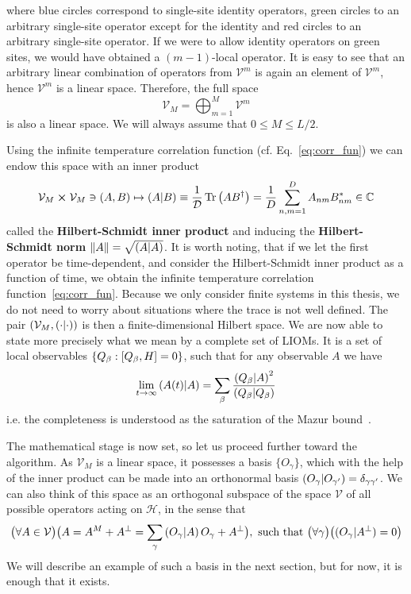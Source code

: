 where blue circles correspond to single-site identity operators, green circles to an arbitrary
single-site operator except for the identity and red circles to an arbitrary single-site operator.
If we were to allow identity operators on green sites, we would have obtained a \((m-1)\)-local operator.
It is easy to see that an arbitrary linear combination of operators from \(\mathcal{V}^m\) is again
an element of \(\mathcal{V}^m\), hence \(\mathcal{V}^m\) is a linear space. Therefore,
the full space
\begin{equation}
    \mathcal{V}_{M} = \bigoplus_{m=1}^{M} \mathcal{V}^m
\end{equation}
is also a linear space. We will always assume that \(0\leq M \leq L/2\).

Using the infinite temperature correlation function (cf. Eq.~\eqref{eq:corr_fun}) we can endow this space with an inner product
\begin{equation}
    \mathcal{V}_M \cross \mathcal{V}_M \ni (A, B) \mapsto \left(A \middle| B\right)
    \equiv \frac{1}{\mathcal{D}}\Tr\left(AB^{\dagger}\right) = \frac{1}{D}\sum_{n,m = 1}^{D} A_{nm} B_{nm}^{\ast} \in \mathbb{C}
    \label{eq:hs_prod}
\end{equation}
called the \textbf{Hilbert-Schmidt inner product} and
inducing the \textbf{Hilbert-Schmidt norm} \(\norm{A} = \sqrt{\left(A \middle| A\right)}\). It is worth noting, that
if we let the first operator be time-dependent, and consider the Hilbert-Schmidt inner product
as a function of time, we obtain the infinite temperature correlation function~\eqref{eq:corr_fun}.
Because we only consider finite systems in this thesis, we do not need to worry about
situations where the trace is not well defined. The pair \( (\mathcal{V}_M, \left(\cdot \middle| \cdot\right)) \)
is then a finite-dimensional Hilbert space.
We are now able to state more precisely what we mean by a complete set of LIOMs.
It is a set of local observables \(\{Q_{\beta} : \comm{Q_{\beta}}{H} = 0\}\), such that
for any observable \(A\) we have
\begin{equation}
    \lim_{t\to\infty} \left(A(t) \middle| A\right) = \sum_{\beta} \frac{\left(Q_{\beta} \middle| A\right)^2}{\left(Q_{\beta} \middle| Q_{\beta}\right)}
\end{equation}
i.e. the completeness is understood as the saturation of the Mazur bound~\autocite{Mazur1969}.

The mathematical stage is now set, so let us proceed further toward the algorithm. 
As \(\mathcal{V}_M\) is a linear space, it possesses a basis \(\{O_{\gamma}\}\),
which with the help of the inner product can be made into an orthonormal basis \(\left(O_{\gamma} \middle| O_{\gamma^{\prime}}\right) = \delta_{\gamma\gamma^{\prime}}\).
We can also think of this space as an orthogonal subspace of the space \(\mathcal{V}\) of all possible operators
acting on \(\mathcal{H}\), in the sense that
\begin{equation}
    \big(\forall A \in \mathcal{V} \big) \big( A = A^M + A^{\perp} = \sum_{\gamma} \left(O_{\gamma} \middle| A\right) O_{\gamma} + A^{\perp}\big) ,
    \text{ such that } \big(\forall \gamma\big) \big( ({O_{\gamma}}|{A^{\perp}}) = 0\big)
    \label{eq:decomposition}
  \end{equation}
We will describe an example of such a basis in the next section, but for now, it is enough that it exists.

